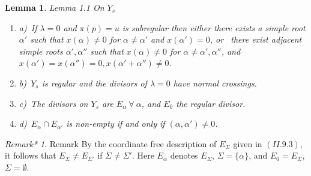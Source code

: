 \documentclass{memo-l}
\newtheorem{lemma}[theorem]{Lemma}
\theoremstyle{definition}
\theoremstyle{remark}
\newtheorem{remark*}{Remark*} %
\numberwithin{section}{chapter}
\numberwithin{equation}{chapter}
\begin{document}
\begin{lemma}{Lemma 1.1} On $Y_{s}$
\begin{enumerate}
\item{a)}\ If ${\lambda}  =  0$ and ${\pi}(p)  =  u$ is subregular then either
 there exists a simple root ${\alpha}'$ such that $x({\alpha})\ne 0$ for
${\alpha}\ne {\alpha}'$ and $x({\alpha}')  =  0$, or        
\ there exist adjacent simple roots ${\alpha}',{\alpha''}$ such that
$x({\alpha})\ne 0$ for ${\alpha}\ne {\alpha}',{\alpha''}$, and
$x({\alpha}')  =  x({\alpha''})  =  0, x({\alpha}'+{\alpha''})\ne 0$.        
\item{b)}\ $Y_{s}$ is regular and the divisors of ${\lambda}  =  0$ have normal
crossings.
\item{c)}\ The divisors on $Y_{s}$ are $E_{{\alpha}} {\ \forall\ } {\alpha}$, and
$E_{0}$ the regular divisor.
\item{d)}\ $E_{{\alpha}} \cap E_{{\alpha}'}$ is non-empty if and only if
$({\alpha},{\alpha}') \ne 0$.  
\end{enumerate}
\end{lemma}

\begin{remark*}{Remark} By the coordinate free
description of $E_{{\Sigma}}$ given in $(II.9.3)$, it follows that
$E_{{\Sigma}} \ne E_{{\Sigma}'}$ if ${\Sigma} \ne {\Sigma}'$.  Here $E_\alpha$
denotes $E_\Sigma$, $\Sigma=\{\alpha\}$, and $E_0 = E_\Sigma$, $\Sigma=\emptyset$.
\end{remark*}
\end{document}
